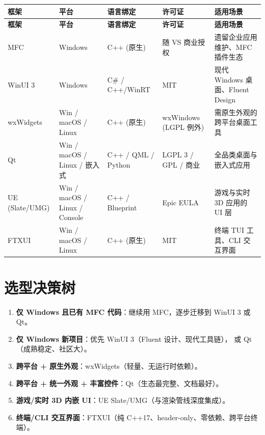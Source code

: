 \documentclass[12pt,a4paper,fontset=fandol]{ctexbook}
\begin{document}
\begin{scriptsize}
\setlength{\tabcolsep}{3pt}
\begin{longtable}{@{}>{\raggedright}p{1.8cm} >{\raggedright}p{2.4cm}
  >{\raggedright}p{2.2cm} >{\raggedright}p{2.2cm}
  >{\raggedright\arraybackslash}p{4.8cm}@{}}
\toprule
\textbf{框架} & \textbf{平台} & \textbf{语言绑定} &
  \textbf{许可证} & \textbf{适用场景} \\
\midrule
\endfirsthead
\toprule
\textbf{框架} & \textbf{平台} & \textbf{语言绑定} &
  \textbf{许可证} & \textbf{适用场景} \\
\midrule
\endhead
MFC & Windows & C++ (原生) &
  随 VS 商业授权 & 遗留企业应用维护、MFC 插件生态 \\
\addlinespace
WinUI 3 & Windows & C\# / C++/WinRT &
  MIT & 现代 Windows 桌面、Fluent Design \\
\addlinespace
wxWidgets & Win / macOS / Linux & C++ (原生) &
  wxWindows (LGPL 例外) & 需原生外观的跨平台桌面工具 \\
\addlinespace
Qt & Win / macOS / Linux / 嵌入式 & C++ / QML / Python &
  LGPL 3 / GPL / 商业 & 全品类桌面与嵌入式应用 \\
\addlinespace
UE (Slate/UMG) & Win / macOS / Linux / Console & C++ / Blueprint &
  Epic EULA & 游戏与实时 3D 应用的 UI 层 \\
\addlinespace
FTXUI & Win / macOS / Linux & C++ (原生) &
  MIT & 终端 TUI 工具、CLI 交互界面 \\
\bottomrule
\end{longtable}
\end{scriptsize}

\section{选型决策树}

\begin{guideline}[title=选型要点]
\begin{enumerate}
  \item \textbf{仅 Windows 且已有 MFC 代码}：继续用 MFC，逐步迁移到 WinUI 3 或 Qt。
  \item \textbf{仅 Windows 新项目}：优先 WinUI 3（Fluent 设计、现代工具链），
        或 Qt（成熟稳定、社区大）。
  \item \textbf{跨平台 + 原生外观}：wxWidgets（轻量、无运行时依赖）。
  \item \textbf{跨平台 + 统一外观 + 丰富控件}：Qt（生态最完整、文档最好）。
  \item \textbf{游戏/实时 3D 内嵌 UI}：UE Slate/UMG（与渲染管线深度集成）。
  \item \textbf{终端/CLI 交互界面}：FTXUI（纯 C++17、header-only、零依赖、跨平台终端）。
\end{enumerate}
\end{guideline}
\end{document}
